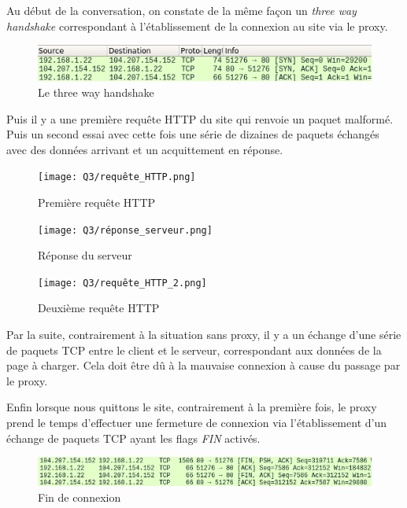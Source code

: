 \documentclass[12 pt,a4paper,frenchb]{article}
\begin{document}
Au début de la conversation, on constate de la même façon un \textit{three way handshake} correspondant à l'établissement de la connexion au site via le proxy.

\begin{figure}[h]
  \centering
  \includegraphics[scale=0.8]{Q3/three_way_handshake.png}
  \caption{Le three way handshake}
\end{figure}
\vspace{1cm}

Puis il y a une première requête HTTP du site qui renvoie un paquet malformé. Puis un second essai avec cette fois une série de dizaines de paquets échangés avec des données arrivant et un acquittement en réponse.

\begin{figure}[h]
  \centering
  \texttt{[image: Q3/requête\_HTTP.png]}
  \caption{Première requête HTTP}
\end{figure}

\begin{figure}[h]
  \centering
  \texttt{[image: Q3/réponse\_serveur.png]}
  \caption{Réponse du serveur}
\end{figure}

\begin{figure}[h]
  \centering
  \texttt{[image: Q3/requête\_HTTP\_2.png]}
  \caption{Deuxième requête HTTP}
\end{figure}

Par la suite, contrairement à la situation sans proxy, il y a un échange d'une série de paquets TCP entre le client et le serveur, correspondant aux données de la page à charger. Cela doit être dû à la mauvaise connexion à cause du passage par le proxy.

Enfin lorsque nous quittons le site, contrairement à la première fois, le proxy prend le temps d'effectuer une fermeture de connexion via l'établissement d'un échange de paquets TCP ayant les flags \textit{FIN} activés.

\begin{figure}[h]
  \centering
  \includegraphics{Q3/fin_de_connexion.png}
  \caption{Fin de connexion}
\end{figure}
\end{document}

